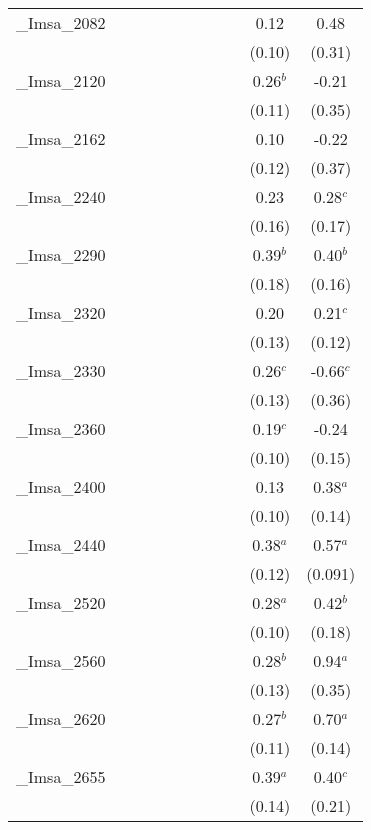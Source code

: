 \documentclass[]{article}
\begin{document}
\begin{tabular}{lcccccccccc}
\_Imsa\_2082 &  &  &  &  &  &  &  &  & 0.12 & 0.48 \\
 &  &  &  &  &  &  &  &  & (0.10) & (0.31) \\
\_Imsa\_2120 &  &  &  &  &  &  &  &  & 0.26$^b$ & -0.21 \\
 &  &  &  &  &  &  &  &  & (0.11) & (0.35) \\
\_Imsa\_2162 &  &  &  &  &  &  &  &  & 0.10 & -0.22 \\
 &  &  &  &  &  &  &  &  & (0.12) & (0.37) \\
\_Imsa\_2240 &  &  &  &  &  &  &  &  & 0.23 & 0.28$^c$ \\
 &  &  &  &  &  &  &  &  & (0.16) & (0.17) \\
\_Imsa\_2290 &  &  &  &  &  &  &  &  & 0.39$^b$ & 0.40$^b$ \\
 &  &  &  &  &  &  &  &  & (0.18) & (0.16) \\
\_Imsa\_2320 &  &  &  &  &  &  &  &  & 0.20 & 0.21$^c$ \\
 &  &  &  &  &  &  &  &  & (0.13) & (0.12) \\
\_Imsa\_2330 &  &  &  &  &  &  &  &  & 0.26$^c$ & -0.66$^c$ \\
 &  &  &  &  &  &  &  &  & (0.13) & (0.36) \\
\_Imsa\_2360 &  &  &  &  &  &  &  &  & 0.19$^c$ & -0.24 \\
 &  &  &  &  &  &  &  &  & (0.10) & (0.15) \\
\_Imsa\_2400 &  &  &  &  &  &  &  &  & 0.13 & 0.38$^a$ \\
 &  &  &  &  &  &  &  &  & (0.10) & (0.14) \\
\_Imsa\_2440 &  &  &  &  &  &  &  &  & 0.38$^a$ & 0.57$^a$ \\
 &  &  &  &  &  &  &  &  & (0.12) & (0.091) \\
\_Imsa\_2520 &  &  &  &  &  &  &  &  & 0.28$^a$ & 0.42$^b$ \\
 &  &  &  &  &  &  &  &  & (0.10) & (0.18) \\
\_Imsa\_2560 &  &  &  &  &  &  &  &  & 0.28$^b$ & 0.94$^a$ \\
 &  &  &  &  &  &  &  &  & (0.13) & (0.35) \\
\_Imsa\_2620 &  &  &  &  &  &  &  &  & 0.27$^b$ & 0.70$^a$ \\
 &  &  &  &  &  &  &  &  & (0.11) & (0.14) \\
\_Imsa\_2655 &  &  &  &  &  &  &  &  & 0.39$^a$ & 0.40$^c$ \\
 &  &  &  &  &  &  &  &  & (0.14) & (0.21) \\

\end{tabular}
\end{document}

